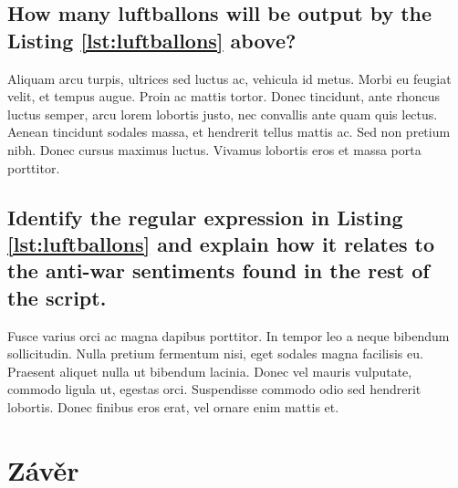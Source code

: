 \documentclass[11pt]{scrartcl} %
\begin{document}

\subsection{How many luftballons will be output by the Listing \ref{lst:luftballons} above?}

Aliquam arcu turpis, ultrices sed luctus ac, vehicula id metus. Morbi eu feugiat velit, et tempus augue. Proin ac mattis tortor. Donec tincidunt, ante rhoncus luctus semper, arcu lorem lobortis justo, nec convallis ante quam quis lectus. Aenean tincidunt sodales massa, et hendrerit tellus mattis ac. Sed non pretium nibh. Donec cursus maximus luctus. Vivamus lobortis eros et massa porta porttitor.


\subsection{Identify the regular expression in Listing \ref{lst:luftballons} and explain how it relates to the anti-war sentiments found in the rest of the script.}

Fusce varius orci ac magna dapibus porttitor. In tempor leo a neque bibendum sollicitudin. Nulla pretium fermentum nisi, eget sodales magna facilisis eu. Praesent aliquet nulla ut bibendum lacinia. Donec vel mauris vulputate, commodo ligula ut, egestas orci. Suspendisse commodo odio sed hendrerit lobortis. Donec finibus eros erat, vel ornare enim mattis et.


\section{Závěr}
\end{document}
